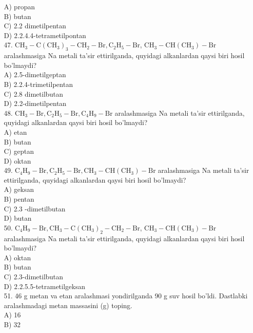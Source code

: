 A) propan\\
B) butan\\
C) 2.2 dimetilpentan\\
D) 2.2.4.4-tetrametilpontan\\
47. $\mathrm{CH}_{3}-\mathrm{C}\left(\mathrm{CH}_{3}\right)_{3}-\mathrm{CH}_{2}-\mathrm{Br}, \mathrm{C}_{2} \mathrm{H}_{5}-\mathrm{Br}$, $\mathrm{CH}_{3}-\mathrm{CH}\left(\mathrm{CH}_{3}\right)-\mathrm{Br}$ aralashmasiga Na metali ta'sir ettirilganda, quyidagi alkanlardan qaysi biri hosil bo'lmaydi?\\
A) 2.5-dimetilgeptan\\
B) 2.2.4-trimetilpentan\\
C) 2.8 dimetilbutan\\
D) 2.2-dimetilpentan\\
48. $\mathrm{CH}_{3}-\mathrm{Br}, \mathrm{C}_{2} \mathrm{H}_{5}-\mathrm{Br}, \mathrm{C}_{4} \mathrm{H}_{9}-\mathrm{Br}$ aralashmasiga Na metali ta'sir ettirilganda, quyidagi alkanlardan qaysi biri hosil bo'lmaydi?\\
A) etan\\
B) butan\\
C) geptan\\
D) oktan\\
49. $\mathrm{C}_{4} \mathrm{H}_{9}-\mathrm{Br}, \mathrm{C}_{2} \mathrm{H}_{5}-\mathrm{Br}, \mathrm{CH}_{3}-\mathrm{CH}\left(\mathrm{CH}_{3}\right)-\mathrm{Br}$ aralashmasiga Na metali ta'sir ettirilganda, quyidagi alkanlardan qaysi biri hosil bo'lmaydi?\\
A) geksan\\
B) pentan\\
C) 2.3 -dimetilbutan\\
D) butan\\
50. $\mathrm{C}_{4} \mathrm{H}_{9}-\mathrm{Br}, \mathrm{CH}_{3}-\mathrm{C}\left(\mathrm{CH}_{3}\right)_{2}-\mathrm{CH}_{2}-\mathrm{Br}$, $\mathrm{CH}_{3}-\mathrm{CH}\left(\mathrm{CH}_{3}\right)-\mathrm{Br}$ aralashmasiga Na metali ta'sir ettirilganda, quyidagi alkanlardan qaysi biri hosil bo'lmaydi?\\
A) oktan\\
B) butan\\
C) 2.3-dimetilbutan\\
D) 2.2.5.5-tetrametilgeksan\\
51. 46 g metan va etan aralashmasi yondirilganda 90 g suv hosil bo'ldi. Dastlabki aralashmadagi metan massasini (g) toping.\\
A) 16\\
B) 32\\
